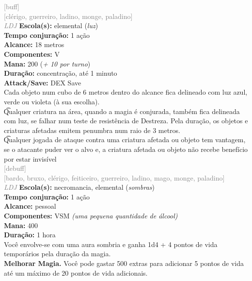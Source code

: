 \documentclass{RPG_Adventure}[2021/10/20]
\begin{document}
{\scriptsize \textcolor{gray}{[buff]\\}}
{\scriptsize \textcolor{gray}{[clérigo, guerreiro, ladino, monge, paladino]\\}}
{\tiny \textcolor{gray}{\textit{LDJ}}}
{\small \t \textbf{Escola(s):} elemental (\textit{luz})\\\t \textbf{Tempo conjuração:} 1 ação\\\t \textbf{Alcance:} 18 metros\\\t \textbf{Componentes:} V\\\t \textbf{Mana:} 200 (\textit{+ 10 por turno})\\\t \textbf{Duração:} concentração, até 1 minuto\\\t \textbf{Attack/Save:} DEX Save\\}
{\normalsize Cada objeto num cubo de 6 metros dentro do alcance fica delineado com luz azul, verde ou violeta (à sua escolha).\\\t Qualquer criatura na área, quando a magia é conjurada, também fica delineada com luz, se falhar num teste de resistência de Destreza. Pela duração, os objetos e criaturas afetadas emitem penumbra num raio de 3 metros.\\\t Qualquer jogada de ataque contra uma criatura afetada ou objeto tem vantagem, se o atacante puder ver o alvo e, a criatura afetada ou objeto não recebe benefício por estar invisível\\}
{\scriptsize \textcolor{gray}{[debuff]\\}}
{\scriptsize \textcolor{gray}{[bardo, bruxo, clérigo, feiticeiro, guerreiro, ladino, mago, monge, paladino]\\}}
{\tiny \textcolor{gray}{\textit{LDJ}}}
{\small \t \textbf{Escola(s):} necromancia, elemental (\textit{sombras})\\\t \textbf{Tempo conjuração:} 1 ação\\\t \textbf{Alcance:} pessoal\\\t \textbf{Componentes:} VSM \textit{(uma pequena quantidade de álcool)}\\\t \textbf{Mana:} 400\\\t \textbf{Duração:} 1 hora\\}
{\normalsize Você envolve-se com uma aura sombria e ganha 1d4 + 4 pontos de vida temporários pela duração da magia.\\\t \textbf{Melhorar Magia.} Você pode gastar 500 extras para adicionar 5 pontos de vida até um máximo de 20 pontos de vida adicionais.\\}
\end{document}
